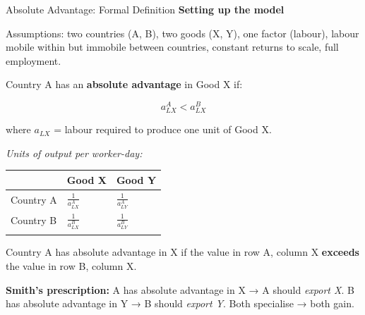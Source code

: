 \documentclass[
  ignorenonframetext,
  aspectratio=169,
]{beamer}
\makeatletter
\let\quarto@originallabel\label
\DeclareRobustCommand*{\label}[1]{\quarto@originallabel{#1}}
\makeatother
\begin{document}
\begin{frame}{Absolute Advantage: Formal Definition}
\label{absolute-advantage-formal-definition}
\textbf{Setting up the model}

Assumptions: two countries (A, B), two goods (X, Y), one factor
(labour), labour mobile within but immobile between countries, constant
returns to scale, full employment.

Country A has an \textbf{absolute advantage} in Good X if:

\[a_{LX}^A < a_{LX}^B\]

where \(a_{LX}\) = labour required to produce one unit of Good X.

\emph{Units of output per worker-day:}

\begin{longtable}[]{@{}lll@{}}
\toprule\noalign{}
& Good X & Good Y \\
\midrule\noalign{}
\endhead
Country A & \(\frac{1}{a_{LX}^A}\) & \(\frac{1}{a_{LY}^A}\) \\
Country B & \(\frac{1}{a_{LX}^B}\) & \(\frac{1}{a_{LY}^B}\) \\
\bottomrule\noalign{}
\end{longtable}

Country A has absolute advantage in X if the value in row A, column X
\textbf{exceeds} the value in row B, column X.

\textbf{Smith's prescription:} A has absolute advantage in X → A should
\emph{export X}. B has absolute advantage in Y → B should \emph{export
Y}. Both specialise → both gain.
\end{frame}
\end{document}
